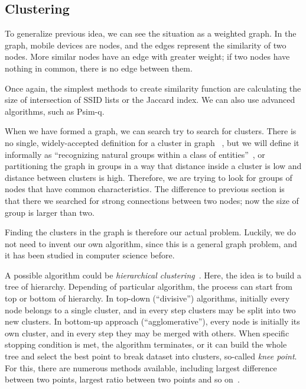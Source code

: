 \documentclass[12pt,a4paper,oneside,pdftex]{report}
\begin{document}
\subsection{Clustering}
\label{subsec:clustering}

To generalize previous idea, we can see the situation as a weighted graph. In the graph, mobile devices are nodes, and the edges represent the similarity of two nodes. More similar nodes have an edge with greater weight; if two nodes have nothing in common, there is no edge between them.

Once again, the simplest methods to create similarity function are calculating the size of intersection of SSID lists or the Jaccard index. We can also use advanced algorithms, such as Psim-q.

When we have formed a graph, we can search try to search for clusters. There is no single, widely-accepted definition for a cluster in graph~\cite{schaeffer2007graph} , but we will define it informally as ``recognizing natural groups within a class of entities''~\cite{van2000graph}, or partitioning the graph in groups in a way that distance inside a cluster is low and distance between clusters is high. Therefore, we are trying to look for groups of nodes that have common characteristics. The difference to previous section is that there we searched for strong connections between two nodes; now the size of group is larger than two.

Finding the clusters in the graph is therefore our actual problem. Luckily, we do not need to invent our own algorithm, since this is a general graph problem, and it has been studied in computer science before.

A possible algorithm could be \emph{hierarchical clustering}~\cite{schaeffer2007graph}. Here, the idea is to build a tree of hierarchy. Depending of particular algorithm, the process can start from top or bottom of hierarchy. In top-down (``divisive'') algorithms, initially every node belongs to a single cluster, and in every step clusters may be split into two new clusters. In bottom-up approach (``agglomerative''), every node is initially its own cluster, and in every step they may be merged with others. When specific stopping condition is met, the algorithm terminates, or it can build the whole tree and select the best point to break dataset into clusters, so-called \emph{knee point}. For this, there are numerous methods available, including largest difference between two points, largest ratio between two points and so on~\cite{salvador2004determining}.
\end{document}
